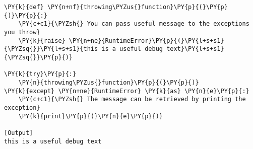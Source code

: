 \begin{Verbatim}[label=\makebox{\url{https://github.com/lucabaldini/cmepda/tree/master/slides/latex/snippets/throwing.py}},commandchars=\\\{\}]
\PY{k}{def} \PY{n+nf}{throwing\PYZus{}function}\PY{p}{(}\PY{p}{)}\PY{p}{:}
    \PY{c+c1}{\PYZsh{} You can pass useful message to the exceptions you throw}
    \PY{k}{raise} \PY{n+ne}{RuntimeError}\PY{p}{(}\PY{l+s+s1}{\PYZsq{}}\PY{l+s+s1}{this is a useful debug text}\PY{l+s+s1}{\PYZsq{}}\PY{p}{)} 

\PY{k}{try}\PY{p}{:}
    \PY{n}{throwing\PYZus{}function}\PY{p}{(}\PY{p}{)}
\PY{k}{except} \PY{n+ne}{RuntimeError} \PY{k}{as} \PY{n}{e}\PY{p}{:}
    \PY{c+c1}{\PYZsh{} The message can be retrieved by printing the exception}
    \PY{k}{print}\PY{p}{(}\PY{n}{e}\PY{p}{)}

[Output]
this is a useful debug text
\end{Verbatim}
